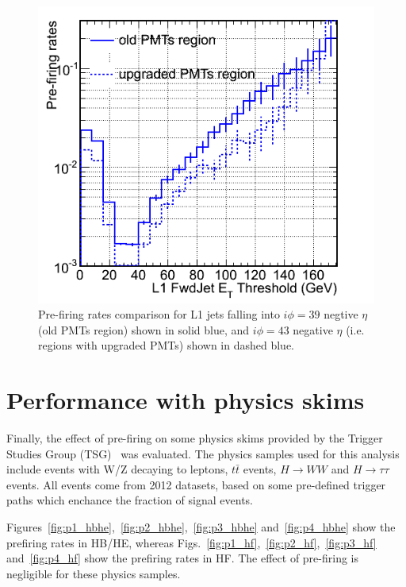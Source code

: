 \documentclass[11pt]{cmspaperpdf}
\begin{document}
\begin{figure}
\centering
\includegraphics[scale=0.4]{plots/rates_comparison_old-vs-new-PMTs.png}
\caption{Pre-firing rates comparison for L1 jets falling into $i \phi=39$ negtive $\eta$ (old PMTs region) shown in solid blue, and $i \phi=43$ negative $\eta$ (i.e. regions with upgraded PMTs) shown in dashed blue. }
\label{fig:imp} 
\end{figure}

\section{Performance with physics skims}

Finally, the effect of pre-firing on some physics skims provided by the Trigger Studies Group (TSG)~\cite{tsg} was evaluated. The physics samples used for this analysis include events with W/Z decaying to leptons, $t \bar{t}$ events, $H \rightarrow WW$ and $H \rightarrow \tau\tau$ events. All events come from 2012 datasets, based on some pre-defined trigger paths which enchance the fraction of signal events.

Figures~\ref{fig:p1_hbhe},~\ref{fig:p2_hbhe},~\ref{fig:p3_hbhe} and~\ref{fig:p4_hbhe} show the prefiring rates in HB/HE, whereas Figs.~\ref{fig:p1_hf},~\ref{fig:p2_hf},~\ref{fig:p3_hf} and~\ref{fig:p4_hf} show the prefiring rates in HF. The effect of pre-firing is negligible for these physics samples.
\end{document}
